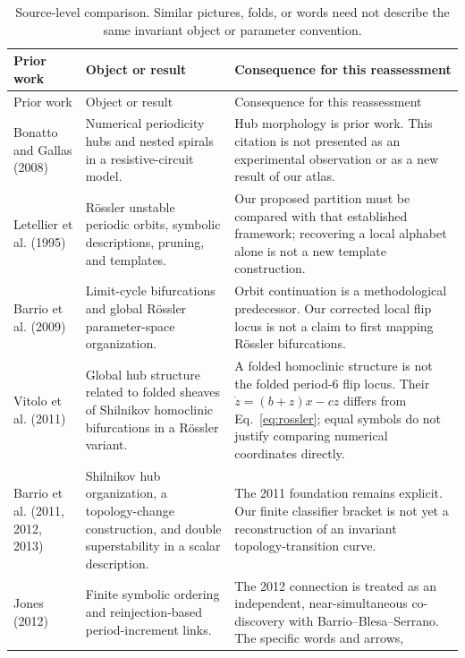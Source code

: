 \begin{longtable}{@{}P{0.24\textwidth}P{0.32\textwidth}P{0.35\textwidth}@{}}
\caption{Source-level comparison. Similar pictures, folds, or words need
not describe the same invariant object or parameter convention.}
\label{tab:prior-work}\\
\toprule
Prior work & Object or result & Consequence for this reassessment \\
\midrule
\endfirsthead
\toprule
Prior work & Object or result & Consequence for this reassessment \\
\midrule
\endhead
\bottomrule
\endfoot
Bonatto and Gallas (2008) \citep{bonatto2008periodicity} &
Numerical periodicity hubs and nested spirals in a resistive-circuit model. &
Hub morphology is prior work. This citation is not presented as an
experimental observation or as a new result of our atlas. \\[0.5em]
Letellier et al. (1995) \citep{letellier1995unstable} &
R{\"o}ssler unstable periodic orbits, symbolic descriptions, pruning, and templates. &
Our proposed partition must be compared with that established framework;
recovering a local alphabet alone is not a new template construction. \\[0.5em]
Barrio et al. (2009) \citep{barrio2009qualitative} &
Limit-cycle bifurcations and global R{\"o}ssler parameter-space organization. &
Orbit continuation is a methodological predecessor. Our corrected local
flip locus is not a claim to first mapping R{\"o}ssler bifurcations. \\[0.5em]
Vitolo et al. (2011) \citep{vitolo2011global} &
Global hub structure related to folded sheaves of Shilnikov homoclinic
bifurcations in a R{\"o}ssler variant. &
A folded homoclinic structure is not the folded period-6 flip locus.
Their $\dot z=(b+z)x-cz$ differs from Eq.~\eqref{eq:rossler}; equal symbols
do not justify comparing numerical coordinates directly. \\[0.5em]
Barrio et al. (2011, 2012, 2013)
\citep{barrio2011global,barrio2012topological,barrio2013spirals} &
Shilnikov hub organization, a topology-change construction, and double
superstability in a scalar description. &
The 2011 foundation remains explicit. Our finite classifier bracket is
not yet a reconstruction of an invariant topology-transition curve. \\[0.5em]
Jones (2012) \citep{jones2012topological} &
Finite symbolic ordering and reinjection-based period-increment links. &
The 2012 connection is treated as an independent, near-simultaneous
co-discovery with Barrio--Blesa--Serrano. The specific words and arrows,

\end{longtable}
